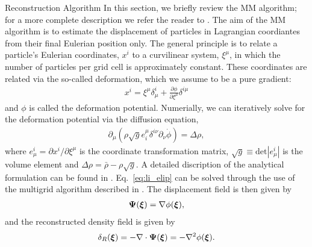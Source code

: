 \begin{section}{Reconstruction Algorithm}
  \label{sec:reconstruction}
  In this section, we briefly review the MM algorithm; for a more
  complete description we refer the reader to \cite{bib:ZhuH2016}.  
  The aim of the MM algorithm is to estimate the displacement of particles in 
  Lagrangian coordiantes from their final Eulerian position only. The
  general principle is to relate a particle's Eulerian coordinates, $x^i$ to
  a curvilinear system, $\xi^\mu$, in which the number of particles
  per grid cell is approximately constant.  These coordinates are
  related via the so-called deformation, which we assume to be a pure
  gradient:
  \begin{align}
    x^i = \xi^\mu \delta^i_\mu + \frac{\partial \phi}{\partial
    \xi^\mu}\delta^{i\mu}
  \end{align}
  and $\phi$ is called the deformation potential.  Numerially, we 
  can iteratively solve for
  the deformation potential via the diffusion equation, 
  \begin{align}
    \label{eq:li_elip}
    \partial _\mu (\rho \sqrt{g} e^\mu _i \delta^{i\nu}
    \partial_\nu \dot{\phi})=\Delta \rho,
  \end{align}
  where $e^i_\mu = \partial x^i / \partial \xi ^ \mu$ is the
  coordinate transformation matrix,
  $\sqrt{g} \equiv \mathrm{det}\left| e^i_\mu\right|$ is the volume
  element and $\Delta \rho = \bar{\rho}-\rho \sqrt{g}$. A detailed discription 
  of the analytical formulation can be found in \cite{bib:Pen1995,bib:Pen1998}.
  Eq.~\ref{eq:li_elip} can be solved through the use of the multigrid
  algorithm described in \cite{bib:Pen1995,bib:Pen1998,bib:ZhuH2016}.
  The displacement field is then given by
  \begin{align}
   \label{eq:disp}
   \boldsymbol{\Psi}(\boldsymbol{\xi})=\nabla \phi(\boldsymbol{\xi}),
  \end{align}
  and the reconstructed density field is given by
  \begin{align}
   \label{eq:delta}
   \delta_R(\boldsymbol{\xi})=- \nabla \cdot \boldsymbol{\Psi}(\boldsymbol{\xi}) = - \nabla^2 \phi(\boldsymbol{\xi}). 
  \end{align}

\end{section}


